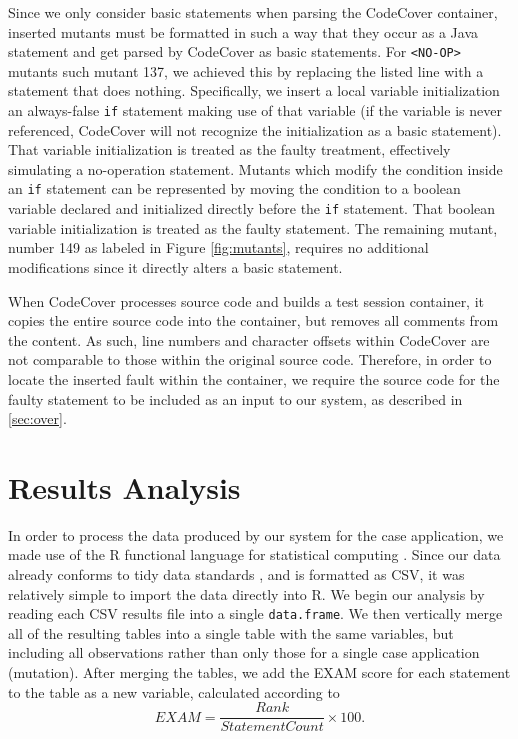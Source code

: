 Since we only consider basic statements when parsing the CodeCover container, inserted mutants
must be formatted in such a way that they occur as a Java statement and get parsed by CodeCover
as basic statements.  For \texttt{<NO-OP>} mutants such mutant 137, we achieved this by replacing
the listed line with a statement that does nothing.  Specifically, we insert a local variable 
initialization an always-false \texttt{if} statement making use of that variable (if the variable
is never referenced, CodeCover will not recognize the initialization as a basic statement).  That 
variable initialization is treated as the faulty treatment, effectively simulating a no-operation
statement.  Mutants which modify the condition inside an \texttt{if} statement can be represented by 
moving the condition to a boolean variable declared and initialized directly before the \texttt{if}
statement.  That boolean variable initialization is treated as the faulty statement.  The remaining
mutant, number 149 as labeled in Figure \ref{fig:mutants}, requires no additional modifications since
it directly alters a basic statement.

When CodeCover processes source code and builds a test session container, it copies the entire source
code into the container, but removes all comments from the content.  As such, line numbers and character
offsets within CodeCover are not comparable to those within the original source code.  Therefore, in
order to locate the inserted fault within the container, we require the source code for the faulty
statement to be included as an input to our system, as described in \ref{sec:over}.

\section{Results Analysis}\label{sec:data}

In order to process the data produced by our system for the case application, we made use of the
R functional language for statistical computing \cite{r}.  Since our data already conforms
to tidy data standards \cite{tidy}, and is formatted as CSV, it was relatively simple to import the
data directly into R.  We begin our analysis by reading each CSV results file into a single 
\texttt{data.frame}.  We then vertically merge all of the resulting tables into a single table with
the same variables, but including all observations rather than only those for a single case 
application (mutation).  After merging the tables, we add the EXAM score for each statement to the table 
as a new variable, calculated according to \[EXAM = \frac{Rank}{StatementCount} \times 100.\]

